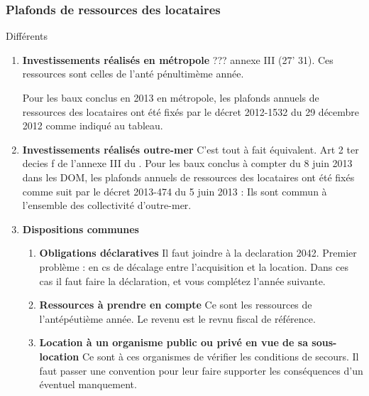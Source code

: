 			\subsubsection{Plafonds de ressources des locataires}

				Différents
				\begin{enumerate}[label=]
					\item \textbf{Investissements réalisés en métropole} ??? annexe III \cgi (27' 31). Ces ressources sont celles de l'anté pénultimème année.

					Pour les baux conclus en 2013 en métropole, les plafonds annuels de ressources des locataires ont été fixés par le décret 2012-1532 du 29 décembre 2012 comme indiqué au tableau.
					\item \textbf{Investissements réalisés outre-mer}
					C'est tout à fait équivalent. Art 2 ter decies f de l'annexe III du \cgi. Pour les baux conclus à compter du 8 juin 2013 dans les DOM, les plafonds annuels de ressources des locataires ont été fixés comme suit par le décret 2013-474 du 5 juin 2013 :
					Ils sont commun à l'ensemble des collectivité d'outre-mer.
					\item \textbf{Dispositions communes}
					\begin{enumerate}[label=\alpha*]
						\item \textbf{Obligations déclaratives} Il faut joindre à la declaration 2042. Premier problème : en cs de décalage entre l'acquisition et la location. Dans ces cas il faut faire la déclaration, et vous complétez l'année suivante.
						\item \textbf{Ressources à prendre en compte} Ce sont les ressources de l'antépéutième année. Le revenu est le revnu fiscal de référence.
						\item \textbf{Location à un organisme public ou privé en vue de sa sous-location} Ce sont à ces organismes de vérifier les conditions de secours. Il faut passer une convention pour leur faire supporter les conséquences d'un éventuel manquement.
					\end{enumerate}
				\end{enumerate}

%
%
%
%
%
%


